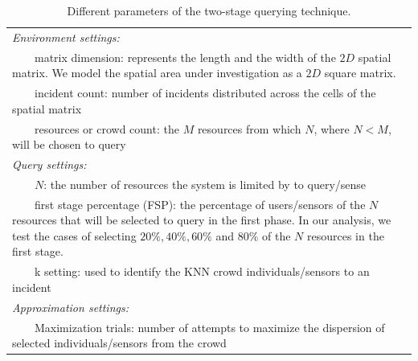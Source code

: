 \documentclass{acm_proc_article-sp}
\newcommand{\tabitem}{~~\llap{\textbullet}~~}
\begin{document}
\begin{table}{}
\centering
\begin{tabulary}{0.5\textwidth}{|L|}
\hline
\textit{Environment settings: }\\
\tabitem matrix dimension: represents the length and
the width of the $2D$ spatial matrix. We model the spatial area under investigation as a $2D$ square matrix.\\
\tabitem incident count: number of incidents distributed across the cells of the spatial matrix\\
\tabitem resources or crowd count: the $M$ resources from which $N$, where $N < M$, will be chosen to query\\
\hline
\textit{Query settings:}\\
\tabitem $N$: the number of resources the system is limited by to query/sense \\
\tabitem first stage percentage (FSP): the percentage of users/sensors of the $N$ resources that will be selected to query in the first phase. In our analysis, we test the cases of selecting $20\%, 40\%, 60\%$ and $80\%$ of the $N$ resources in the first stage.\\
\tabitem k setting: used to identify the KNN crowd individuals/sensors to an incident\\
\hline
\textit{Approximation settings: }\\
\tabitem Maximization trials: number of attempts to maximize the dispersion of selected individuals/sensors from the crowd\\
\hline
\end{tabulary} 
\caption{Different parameters of the two-stage querying technique.}
\label{table:systemParameters}
\end{table}
\end{document}
